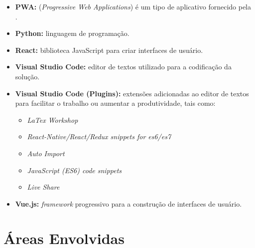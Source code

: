 \begin{itemize}
    \item \textbf{PWA:} (\textit{Progressive Web Applications}) é um tipo de \software{} aplicativo fornecido pela \web{}.
    \item \textbf{Python:} linguagem de programação.
    \item \textbf{React:} biblioteca JavaScript para criar interfaces de usuário.
    \item \textbf{Visual Studio Code:} editor de textos utilizado para a codificação da solução.
    \item \textbf{Visual Studio Code (Plugins):} extensões adicionadas ao editor de textos para facilitar o trabalho ou aumentar a produtividade, tais como:
    \begin{itemize}
        \item \textit{LaTex Workshop}
        \item \textit{React-Native/React/Redux snippets for es6/es7}
        \item \textit{Auto Import}
        \item \textit{JavaScript (ES6) code snippets}
        \item \textit{Live Share}
    \end{itemize}
    \item \textbf{Vue.js:} \textit{framework} progressivo para a construção de interfaces de usuário.
\end{itemize}




\section{Áreas Envolvidas}
\label{sec:areas_envolvidas}